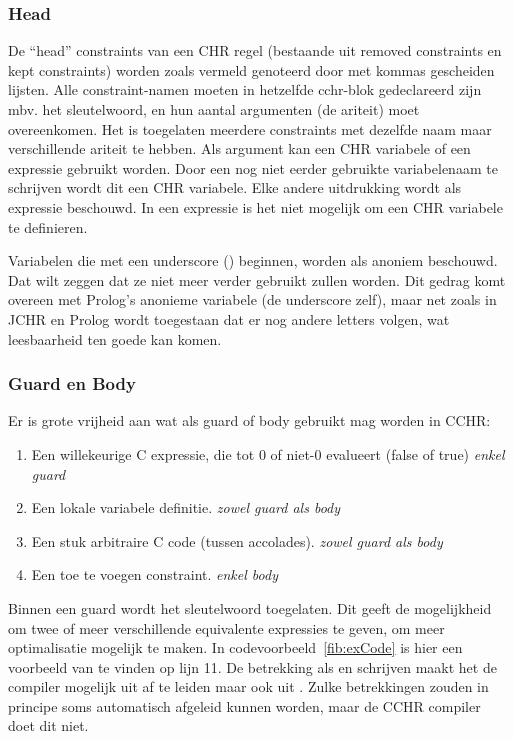 \subsubsection{Head}

De ``head'' constraints van een CHR regel (bestaande uit removed constraints en kept constraints) worden zoals vermeld genoteerd door met kommas gescheiden lijsten. Alle constraint-namen moeten in hetzelfde cchr-blok gedeclareerd zijn mbv. het  sleutelwoord, en hun aantal argumenten (de ariteit) moet overeenkomen. Het is toegelaten meerdere constraints met dezelfde naam maar verschillende ariteit te hebben. Als argument kan een CHR variabele of een expressie gebruikt worden. Door een nog niet eerder gebruikte variabelenaam te schrijven wordt dit een CHR variabele. Elke andere uitdrukking wordt als expressie beschouwd. In een expressie is het niet mogelijk om een CHR variabele te definieren.

Variabelen die met een underscore (\code{\_}) beginnen, worden als anoniem beschouwd. Dat wilt zeggen dat ze niet meer verder gebruikt zullen worden. Dit gedrag komt overeen met Prolog's anonieme variabele (de underscore zelf), maar net zoals in JCHR en Prolog wordt toegestaan dat er nog andere letters volgen, wat leesbaarheid ten goede kan komen.

\subsubsection{Guard en Body}

Er is grote vrijheid aan wat als guard of body gebruikt mag worden in CCHR: \begin{enumerate}
  \item Een willekeurige C expressie, die tot 0 of niet-0 evalueert (false of true) \em{enkel guard}
  \item Een lokale variabele definitie. \em{zowel guard als body}
  \item Een stuk arbitraire C code (tussen accolades). \em{zowel guard als body}
  \item Een toe te voegen constraint. \em{enkel body}
\end{enumerate}

Binnen een guard wordt het sleutelwoord  toegelaten. Dit geeft de mogelijkheid om twee of meer verschillende equivalente expressies te geven, om meer optimalisatie mogelijk te maken. In codevoorbeeld~\ref{fib:exCode} is hier een voorbeeld van te vinden op lijn 11. De betrekking als  en  schrijven maakt het de compiler mogelijk  uit  af te leiden maar ook  uit . Zulke betrekkingen zouden in principe soms automatisch afgeleid kunnen worden, maar de CCHR compiler doet dit niet.


